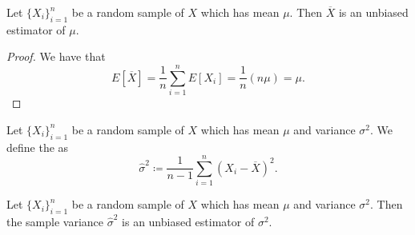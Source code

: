 \documentclass[notoc,notitlepage]{tufte-book}
\begin{document}
\begin{propo}\label{propo:sample_mean_as_the_unbiased_estimator_of_the_mean}
  Let $\{ X_i \}_{i=1}^n$ be a random sample of $X$ which has mean $\mu$. Then
  $\overline{X}$ is an unbiased estimator of $\mu$.
\end{propo}

\begin{proof}
  We have that
  \begin{equation*}
    E[\overline{X}] = \frac{1}{n} \sum_{i=1}^{n} E[X_i] = \frac{1}{n} (n\mu) =
    \mu.
  \end{equation*}
\end{proof}

\begin{defn}\label{defn:sample_variance}
  Let $\{ X_i \}_{i=1}^n$ be a random sample of $X$ which has mean $\mu$ and
  variance $\sigma^2$. We define the  as
  \begin{equation*}
    \hat{\sigma}^2 \coloneqq \frac{1}{n-1} \sum_{i=1}^{n} (X_i -
    \overline{X})^2.
  \end{equation*}
\end{defn}

\begin{propo}\label{propo:sample_variance_as_the_unbiased_estimator_of_the_variance}
  Let $\{ X_i \}_{i=1}^n$ be a random sample of $X$ which has mean $\mu$ and
  variance $\sigma^2$. Then the sample variance $\hat{\sigma}^2$ is an unbiased
  estimator of $\sigma^2$.
\end{propo}
\end{document}
